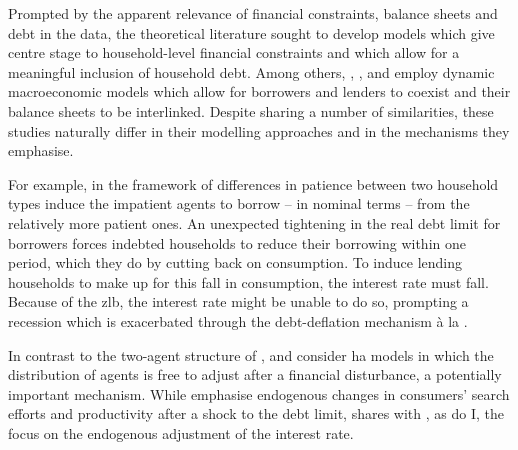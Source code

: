 \documentclass[12pt]{article} %
\numberwithin{equation}{section} %
\numberwithin{figure}{section}
\numberwithin{table}{section}
\begin{document}
Prompted by the apparent relevance of financial constraints, balance sheets and debt in the data, the theoretical literature sought to develop models which give centre stage to household-level financial constraints and which allow for a meaningful inclusion of household debt. Among others, \textcite{egg2012}, \textcite{riosrull2015}, \textcite{justiniano2015} and \textcite{gl2017} employ dynamic macroeconomic models which allow for borrowers and lenders to coexist and their balance sheets to be interlinked. Despite sharing a number of similarities, these studies naturally differ in their modelling approaches and in the mechanisms they emphasise.

For example, in the framework of \textcite{egg2012} differences in patience between two household types induce the impatient agents to borrow -- in nominal terms -- from the relatively more patient ones. An unexpected tightening in the real debt limit for borrowers forces indebted households to reduce their borrowing within one period, which they do by cutting back on consumption. To induce lending households to make up for this fall in consumption, the interest rate must fall. Because of the \Gls{zlb}, the interest rate might be unable to do so, prompting a recession which is exacerbated through the debt-deflation mechanism à la \textcite{fisher1933}.


In contrast to the two-agent structure of \textcite{egg2012}, \textcite{riosrull2015} and \textcite{gl2017} consider \Gls{ha} models in which the distribution of agents is free to adjust after a financial disturbance, a potentially important mechanism. While \textcite{riosrull2015} emphasise endogenous changes in consumers' search efforts and productivity after a shock to the debt limit, \textcite{gl2017} shares with \textcite{egg2012}, as do I, the focus on the endogenous adjustment of the interest rate.
\end{document}
